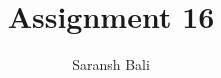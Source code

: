 \documentclass[journal,12pt,twocolumn]{IEEEtran}
\begin{document}
	\makeatletter
	\makeatother
	\let\StandardTheFigure\thefigure
	\let\vec\mathbf
	\renewcommand{\thefigure}{\theproblem}
	\def\putbox#1#2#3{\makebox[0in][l]{\makebox[#1][l]{}\raisebox{\baselineskip}[0in][0in]{\raisebox{#2}[0in][0in]{#3}}}}
	\def\rightbox#1{\makebox[0in][r]{#1}}
	\def\centbox#1{\makebox[0in]{#1}}
	\def\topbox#1{\raisebox{-\baselineskip}[0in][0in]{#1}}
	\def\midbox#1{\raisebox{-0.5\baselineskip}[0in][0in]{#1}}
	\vspace{3cm}
	\title{Assignment 16}
	\author{Saransh Bali}
\end{document}
